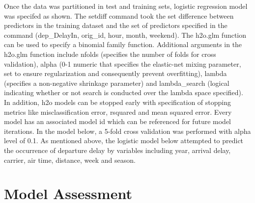\documentclass[12pt,twoside]{amherstthesis}
\begin{document}
  Once the data was partitioned in test and training sets, logistic
  regression model was specifed as shown. The setdiff command took the set
  difference between predictors in the training dataset and the set of
  predictors specified in the command (dep\_DelayIn, orig\_id, hour,
  month, weekend). The h2o.glm function can be used to specify a binomial
  family function. Additional arguments in the h2o.glm function include
  nfolds (specifies the number of folds for cross validation), alpha (0-1
  numeric that specifies the elastic-net mixing parameter, set to ensure
  regularization and consequently prevent overfitting), lambda (specifies
  a non-negative shrinkage parameter) and lambda\_search (logical
  indicating whether or not search is conducted over the lambda space
  specified). In addition, h2o models can be stopped early with
  specification of stopping metrics like misclassification error, rsquared
  and mean squared error. Every model has an associated model id which can
  be referenced for future model iterations. In the model below, a 5-fold
  cross validation was performed with alpha level of 0.1. As mentioned
  above, the logistic model below attempted to predict the occurrence of
  departure delay by variables including year, arrival delay, carrier, air
  time, distance, week and season.
  
  \begin{Shaded}
  \begin{Highlighting}[]
  \StringTok{ }\NormalTok{(}\NormalTok{(}\NormalTok{, }
                                      \NormalTok{, }\NormalTok{, }
                                      \NormalTok{, }\NormalTok{))}
   
  \StringTok{ }\NormalTok{(} \NormalTok{, } 
                      \NormalTok{,}
           \NormalTok{, } \NormalTok{, } \NormalTok{)}
  \end{Highlighting}
  \end{Shaded}
  
  \section{Model Assessment}\label{model-assessment}
  
\end{document}
